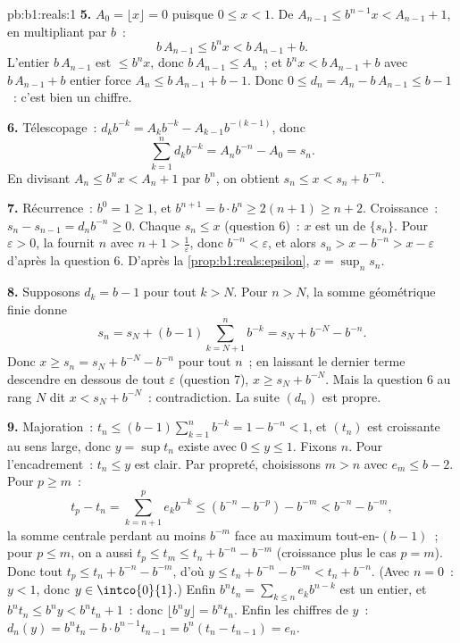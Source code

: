 \begin{solution}{pb:b1:reals:1}
\textbf{5.} $A_0 = \lfloor x \rfloor = 0$ puisque $0 \leq x < 1$.
De $A_{n-1} \leq b^{n-1} x < A_{n-1} + 1$, en multipliant par $b$~:
\[
b\,A_{n-1} \leq b^n x < b\,A_{n-1} + b .
\]
L'entier $b\,A_{n-1}$ est $\leq b^n x$, donc $b\,A_{n-1} \leq
A_n$~; et $b^n x < b\,A_{n-1} + b$ avec $b\,A_{n-1} + b$ entier
force $A_n \leq b\,A_{n-1} + b - 1$. Donc $0 \leq d_n =
A_n - b\,A_{n-1} \leq b - 1$~: c'est bien un chiffre.

\textbf{6.} Télescopage~: $d_k b^{-k} = A_k b^{-k} - A_{k-1}
b^{-(k-1)}$, donc
\[
\sum_{k=1}^n d_k b^{-k} = A_n b^{-n} - A_0 = s_n .
\]
En divisant $A_n \leq b^n x < A_n + 1$ par $b^n$, on obtient $s_n
\leq x < s_n + b^{-n}$.

\textbf{7.} Récurrence~: $b^0 = 1 \geq 1$, et $b^{n+1} = b \cdot
b^n \geq 2(n + 1) \geq n + 2$. Croissance~: $s_n - s_{n-1} = d_n
b^{-n} \geq 0$. Chaque $s_n \leq x$ (question 6)~: $x$ est un
 de $\{s_n\}$. Pour $\varepsilon > 0$, la  fournit $n$ avec $n + 1 > \frac1\varepsilon$, donc
$b^{-n} < \varepsilon$, et alors $s_n > x - b^{-n} > x -
\varepsilon$ d'après la question 6. D'après la
\cref{prop:b1:reals:epsilon}, $x = \sup_n s_n$.

\textbf{8.} Supposons $d_k = b - 1$ pour tout $k > N$. Pour $n >
N$, la somme géométrique finie donne
\[
s_n = s_N + (b - 1)\sum_{k=N+1}^{n} b^{-k}
= s_N + b^{-N} - b^{-n} .
\]
Donc $x \geq s_n = s_N + b^{-N} - b^{-n}$ pour tout $n$~; en
laissant le dernier terme descendre en dessous de tout
$\varepsilon$ (question 7), $x \geq s_N + b^{-N}$. Mais la question
6 au rang $N$ dit $x < s_N + b^{-N}$~: contradiction. La suite
$(d_n)$ est propre.

\textbf{9.} Majoration~: $t_n \leq (b-1)\sum_{k=1}^n b^{-k} = 1 -
b^{-n} < 1$, et $(t_n)$ est croissante au sens large, donc $y =
\sup t_n$ existe avec $0 \leq y \leq 1$. Fixons $n$. Pour
l'encadrement~: $t_n \leq y$ est clair. Par propreté, choisissons
$m > n$ avec $e_m \leq b - 2$. Pour $p \geq m$~:
\[
t_p - t_n = \sum_{k=n+1}^{p} e_k b^{-k}
\leq (b^{-n} - b^{-p}) - b^{-m} < b^{-n} - b^{-m},
\]
la somme centrale perdant au moins $b^{-m}$ face au maximum
tout-en-$(b-1)$~; pour $p \leq m$, on a aussi $t_p \leq t_m \leq
t_n + b^{-n} - b^{-m}$ (croissance plus le cas $p = m$). Donc tout
$t_p \leq t_n + b^{-n} - b^{-m}$, d'où $y \leq t_n + b^{-n} -
b^{-m} < t_n + b^{-n}$. (Avec $n = 0$~: $y < 1$, donc $y \in
\intco{0}{1}$.) Enfin $b^n t_n = \sum_{k \leq n} e_k b^{n-k}$ est
un entier, et $b^n t_n \leq b^n y < b^n t_n + 1$~: donc $\lfloor
b^n y \rfloor = b^n t_n$. Enfin les chiffres de $y$~: $d_n(y) = b^n
t_n - b \cdot b^{n-1} t_{n-1} = b^n(t_n - t_{n-1}) = e_n$.


\end{solution}
